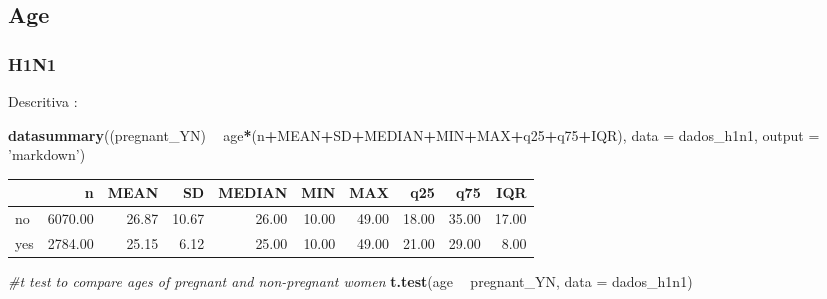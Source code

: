 \documentclass[
]{article}
\newenvironment{Shaded}{\begin{snugshade}}{\end{snugshade}}
\newcommand{\CommentTok}[1]{\textcolor[rgb]{0.56,0.35,0.01}{\textit{#1}}}
\newcommand{\DataTypeTok}[1]{\textcolor[rgb]{0.13,0.29,0.53}{#1}}
\newcommand{\DecValTok}[1]{\textcolor[rgb]{0.00,0.00,0.81}{#1}}
\newcommand{\KeywordTok}[1]{\textcolor[rgb]{0.13,0.29,0.53}{\textbf{#1}}}
\newcommand{\NormalTok}[1]{#1}
\newcommand{\OperatorTok}[1]{\textcolor[rgb]{0.81,0.36,0.00}{\textbf{#1}}}
\newcommand{\StringTok}[1]{\textcolor[rgb]{0.31,0.60,0.02}{#1}}
\begin{document}
\hypertarget{age}{%
\subsection{Age}\label{age}}

\hypertarget{h1n1}{%
\subsubsection{H1N1}\label{h1n1}}

\begin{Shaded}
\end{Shaded}

Descritiva :

\begin{Shaded}
\begin{Highlighting}[]
\KeywordTok{datasummary}\NormalTok{((pregnant_YN) }\OperatorTok{~}\StringTok{ }\NormalTok{age}\OperatorTok{*}\NormalTok{(n}\OperatorTok{+}\NormalTok{MEAN}\OperatorTok{+}\NormalTok{SD}\OperatorTok{+}\NormalTok{MEDIAN}\OperatorTok{+}\NormalTok{MIN}\OperatorTok{+}\NormalTok{MAX}\OperatorTok{+}\NormalTok{q25}\OperatorTok{+}\NormalTok{q75}\OperatorTok{+}\NormalTok{IQR),}
            \DataTypeTok{data =}\NormalTok{ dados_h1n1, }\DataTypeTok{output =} \StringTok{'markdown'}\NormalTok{)}
\end{Highlighting}
\end{Shaded}

\begin{longtable}[]{@{}lrrrrrrrrr@{}}
\toprule
& n & MEAN & SD & MEDIAN & MIN & MAX & q25 & q75 & IQR\tabularnewline
\midrule
\endhead
no & 6070.00 & 26.87 & 10.67 & 26.00 & 10.00 & 49.00 & 18.00 & 35.00 &
17.00\tabularnewline
yes & 2784.00 & 25.15 & 6.12 & 25.00 & 10.00 & 49.00 & 21.00 & 29.00 &
8.00\tabularnewline
\bottomrule
\end{longtable}

\begin{Shaded}
\begin{Highlighting}[]
\CommentTok{#t test to compare ages of pregnant and non-pregnant women}
\KeywordTok{t.test}\NormalTok{(age }\OperatorTok{~}\StringTok{ }\NormalTok{pregnant_YN, }\DataTypeTok{data =}\NormalTok{ dados_h1n1)}
\end{Highlighting}
\end{Shaded}
\end{document}
